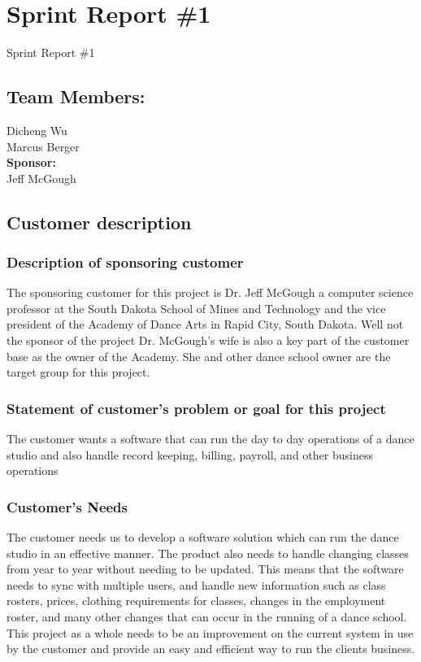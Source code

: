 

\section{Sprint Report \#1}
Sprint Report \#1


\subsection{Team Members:}
Dicheng Wu
\\Marcus Berger\\
\textbf{Sponsor:}
\\Jeff McGough
\\

\subsection{Customer description}

\subsubsection{Description of sponsoring customer}
The sponsoring customer for this project is Dr. Jeff McGough a computer science professor at the South Dakota School of Mines and Technology and the vice president of the Academy of Dance Arts in Rapid City, South Dakota. Well not the sponsor of the project Dr. McGough's wife is also a key part of the customer base as the owner of the Academy. She and other dance school owner are the target group for this project. 

\subsubsection{Statement of customer's problem or goal for this project}
The customer wants a software that can run the day to day operations of a dance studio and also handle record keeping, billing, payroll, and other business operations
 
\subsubsection{Customer's Needs}
The customer needs us to develop a software solution which can run the dance studio in an effective manner. The product also needs to handle changing classes from year to year without needing to be updated. This means that the software needs to sync with multiple users, and handle new information such as class rosters, prices, clothing requirements for classes, changes in the employment roster, and many other changes that can occur in the running of a dance school.\\
This project as a whole needs to be an improvement on the current system in use by the customer and provide an easy and efficient way to run the clients business. 



